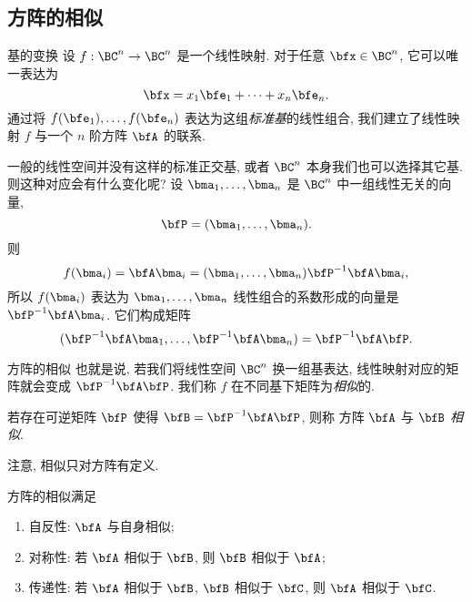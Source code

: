 \subsection{方阵的相似}

\begin{frame}{基的变换}
	\onslide<+->
	设 $f:\BC^n\to \BC^n$ 是一个线性映射.
	\onslide<+->
	对于任意 $\bfx\in \BC^n$, 它可以唯一表达为
	\[\bfx=x_1\bfe_1+\cdots+x_n\bfe_n.\]
	\onslide<+->
	通过将 $f(\bfe_1),\dots,f(\bfe_n)$ 表达为这组\emph{标准基}的线性组合, 我们建立了线性映射 $f$ 与一个 $n$ 阶方阵 $\bfA$ 的联系.

	\onslide<+->
	一般的线性空间并没有这样的标准正交基, 或者 $\BC^n$ 本身我们也可以选择其它基.
	\onslide<+->
	则这种对应会有什么变化呢?
	\onslide<+->
	设 $\bma_1,\dots,\bma_n$ 是 $\BC^n$ 中一组线性无关的向量, 
	\[\bfP=(\bma_1,\dots,\bma_n).\]
	\onslide<+->
	则
	\[f(\bma_i)=\bfA\bma_i=(\bma_1,\dots,\bma_n)\bfP^{-1}\bfA\bma_i,\]
	所以 $f(\bma_i)$ 表达为 $\bma_1,\dots,\bma_n$ 线性组合的系数形成的向量是 $\bfP^{-1}\bfA\bma_i$.
	\onslide<+->
	它们构成矩阵
	\[(\bfP^{-1}\bfA\bma_1,\dots,\bfP^{-1}\bfA\bma_n)=\bfP^{-1}\bfA\bfP.\]
\end{frame}


\begin{frame}{方阵的相似}
	\onslide<+->
	也就是说, 若我们将线性空间 $\BC^n$ 换一组基表达, 线性映射对应的矩阵就会变成 $\bfP^{-1}\bfA\bfP$.
	\onslide<+->
	我们称 $f$ 在不同基下矩阵为\emph{相似}的.
	\onslide<+->
	\begin{definition}
		若存在可逆矩阵 $\bfP$ 使得 $\bfB=\bfP^{-1}\bfA\bfP$, 则称 方阵 $\bfA$ 与 $\bfB$ \emph{相似}.
	\end{definition}
	\onslide<+->
	注意, 相似只对方阵有定义.
	\onslide<+->
	\begin{proposition}
		方阵的相似满足
		\begin{enumerate}
			\item 自反性: $\bfA$ 与自身相似;
			\item 对称性: 若 $\bfA$ 相似于 $\bfB$, 则 $\bfB$ 相似于 $\bfA$;
			\item 传递性: 若 $\bfA$ 相似于 $\bfB$, $\bfB$ 相似于 $\bfC$, 则 $\bfA$ 相似于 $\bfC$.
		\end{enumerate}
	\end{proposition}
\end{frame}


